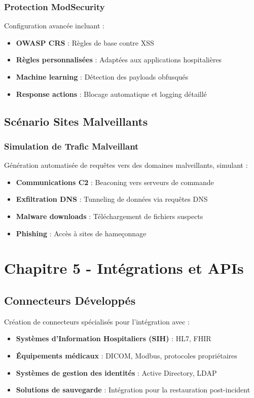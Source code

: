 \subsubsection{Protection ModSecurity}
Configuration avancée incluant :
\begin{itemize}
    \item \textbf{OWASP CRS} : Règles de base contre XSS
    \item \textbf{Règles personnalisées} : Adaptées aux applications hospitalières
    \item \textbf{Machine learning} : Détection des payloads obfusqués
    \item \textbf{Response actions} : Blocage automatique et logging détaillé
\end{itemize}

\subsection{Scénario Sites Malveillants}

\subsubsection{Simulation de Trafic Malveillant}
Génération automatisée de requêtes vers des domaines malveillants, simulant :
\begin{itemize}
    \item \textbf{Communications C2} : Beaconing vers serveurs de commande
    \item \textbf{Exfiltration DNS} : Tunneling de données via requêtes DNS
    \item \textbf{Malware downloads} : Téléchargement de fichiers suspects
    \item \textbf{Phishing} : Accès à sites de hameçonnage
\end{itemize}

\section{Chapitre 5 - Intégrations et APIs}

\subsection{Connecteurs Développés}

Création de connecteurs spécialisés pour l'intégration avec :
\begin{itemize}
    \item \textbf{Systèmes d'Information Hospitaliers (SIH)} : HL7, FHIR
    \item \textbf{Équipements médicaux} : DICOM, Modbus, protocoles propriétaires
    \item \textbf{Systèmes de gestion des identités} : Active Directory, LDAP
    \item \textbf{Solutions de sauvegarde} : Intégration pour la restauration post-incident
\end{itemize}

